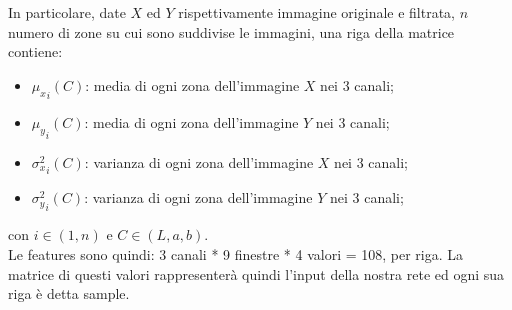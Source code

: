 \documentclass[a4paper,11pt]{article}
\begin{document}
    In particolare, date $X$ ed $Y$ rispettivamente immagine originale e filtrata, $n$ numero di zone su cui sono suddivise le immagini,
    una riga della matrice contiene: 
    \begin{itemize}
        \item ${\mu_x}_i(C)$: media di ogni zona dell'immagine $X$ nei 3 canali;
        \item ${\mu_y}_i(C)$:  media di ogni zona dell'immagine $Y$ nei 3 canali;
        \item ${\sigma^2_x}_i(C)$: varianza di ogni zona dell'immagine $X$ nei 3 canali;
        \item ${\sigma^2_y}_i(C)$: varianza di ogni zona dell'immagine $Y$ nei 3 canali;
    \end{itemize}
    con $i \in (1,n)$ e $C \in (L, a, b)$.
    \\Le features sono quindi: 3 canali * 9 finestre * 4 valori = 108, per riga.
    La matrice di questi valori rappresenterà quindi l'input della nostra rete ed ogni sua riga è detta sample.
    \newpage
\end{document}
